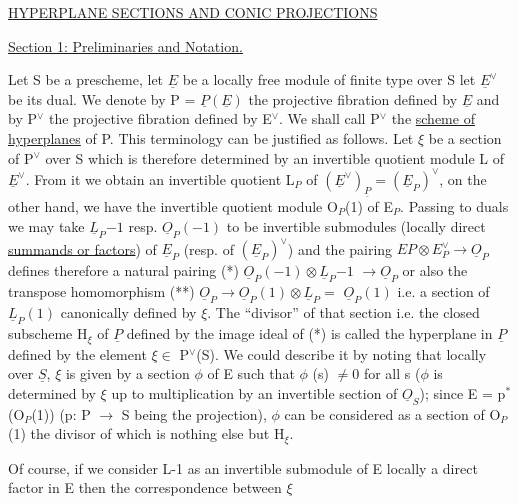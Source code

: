 
\uline{HYPERPLANE SECTIONS AND CONIC PROJECTIONS}

\uline{Section 1: Preliminaries and Notation.}

Let S be a prescheme, let $\underline{E}$ be a locally free module of
finite type over S let $\underline{E}^{\vee}$ be its dual. We denote by P = $\underline{P}(\underline{E})$ the
projective fibration defined by $\underline{E}$ and by P$^{\vee}$ the projective
fibration defined by E$^{\vee}$. We shall call P$^{\vee}$ the \uline{scheme of}
\uline{hyperplanes} of P. This terminology can be justified as follows.
Let $\xi$ be a section of P$^{\vee}$ over S which is therefore determined by an
invertible quotient module L of $\underline{E}^{\vee}$. From it we obtain an
invertible quotient L$_{P}$ of $(\underline{E}^{\vee})_{\underline{P}} = (\underline{E}_{P})^{\vee}$, on the other hand, we have
the invertible quotient module O$_{P}$(1) of E$_{P}$. Passing to duals we
may take $\underline{L}_{P}{-1}$ resp. $\underline{O}_{P}(-1)$ to be invertible submodules (locally
direct \uline{summands or factors}) of $\underline{E}_{P}$ (resp. of $(\underline{E}_{P})^{\vee}$) and the pairing
$EP \otimes E^{\vee}_{P} \to \underline{O}_{P}$ defines therefore a natural pairing (*) $\underline{O}_{P}(-1) \otimes \underline{L}_{P}{-1}$
$\to \underline{O}_{P}$ or also the transpose homomorphism (**) $\underline{O}_{P} \to \underline{O}_{P}(1) \otimes \underline{L}_{P} =$
$\underline{O}_{P}(1)$ i.e. a section of $\underline{L}_{P}(1)$ canonically defined by $\xi$. The
``divisor'' of that section i.e. the closed subscheme H$_{\xi}$ of $\underline{P}$ defined
by the image ideal of (*) is called the hyperplane in $\underline{P}$ defined by
the element $\xi \in$ P$^{\vee}$(S). We could describe it by noting that locally
over $\underline{S}$, $\xi$ is given by a section $\phi$ of E such that $\phi$ (s) $\neq 0$ for all
s ($\phi$ is determined by $\xi$ up to multiplication by an invertible
section of $\underline{O}_{S}$); since E = p$^{*}$(O$_{P}$(1)) (p: P $\to$ S being the
projection), $\phi$ can be considered as a section of O$_{P}$(1) the divisor
of which is nothing else but H$_{\xi}$.

Of course, if we consider L-1 as an invertible submodule of E
locally a direct factor in E then the correspondence between $\xi$

